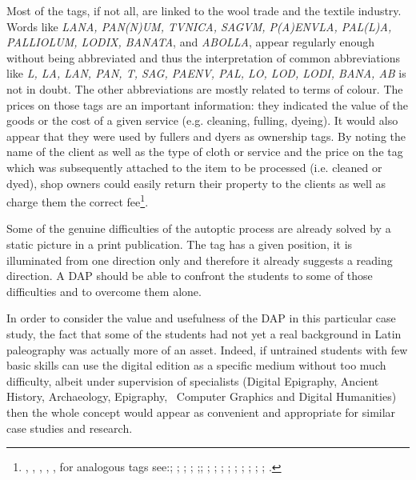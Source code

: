 \documentclass[amsthm,ebook]{saparticle}
\begin{document}
\begin{figure}
\centering

\end{figure}
Most of the tags, if not all, are linked to the wool trade and the textile industry. Words like \emph{LANA, PAN(N)UM, TVNICA, SAGVM, P(A)ENVLA, PAL(L)A, PALLIOLUM, LODIX, BANATA}, and \emph{ABOLLA}, appear regularly enough without being abbreviated and
thus the interpretation of common abbreviations like \emph{L, LA, LAN, PAN, T, SAG, PAENV, PAL, LO, LOD, LODI, BANA, AB} is
not in doubt. The other abbreviations are mostly related to terms of colour. The prices on those tags are an important
information: they indicated the value of the goods or the cost of a given service (e.g. cleaning, fulling, dyeing). It
would also appear that they were used by fullers and dyers as ownership tags. By noting the name of the client as well
as the type of cloth or service and the price on the tag which was subsequently attached to the item to be processed
(i.e. cleaned or dyed), shop owners could easily return their property to the clients as well as charge them the
correct fee\footnote{\citet{radman_livaja_segestica_2008}, \citet{radman-livaja_roetiquettes_2010}, \citet{radman-livaja_5_2013}, \citet[165-172]{radman-livaja_two_2013}, \citet{radman-livaja_plombs_2014}, for analogous tags see:\citet[97-104]{mocsy_olom_1956}; \citet[195-210]{egger_funf_1968}; \citet[127-138]{frei-stolba_les_2011}; \citet[121-137]{schwinden_romerzeitliche_1985}; \citet[215-222]{schwinden_zwei_1993};\citet{romer-martijnse_romerzeitliche_1990}; \citet[5-48]{romer-martijnse_fruhkaiserzeitliche_1997}; \citet[301-305]{feugere_etiquette_1993}; \citet[211-220]{weiss_bleietiketten_1991}; \citet[29-40]{paci_etichette_1995}; \citet[207-216]{bassi_tre_1996}; \citet[121-135]{bizzarini_quattro_2005}; \citet[43-51]{buchi_etichette_2005}; \citet[42-110]{cresci_supellex_2010}; \citet[295-317]{jacques_artisanat_2010}; \citet[237-246]{wedenig_bleietikett_2013}.}. 

Some of the genuine difficulties of the autoptic process are already solved by a static picture in a print publication.
The tag has a given position, it is illuminated from one direction only and therefore it already suggests a reading
direction. A DAP should be able to confront the students to some of those difficulties and to overcome them alone.

In order to consider the value and usefulness of the DAP in this particular case study, the fact that some of the
students had not yet a real background in Latin paleography was actually more of an asset. Indeed, if untrained
students with few basic skills can use the digital edition as a specific medium without too much difficulty, albeit
under supervision of specialists (Digital Epigraphy, Ancient History, Archaeology, Epigraphy, \ Computer Graphics and
Digital Humanities) then the whole concept would appear as convenient and appropriate for similar case studies and
research. 
\end{document}
